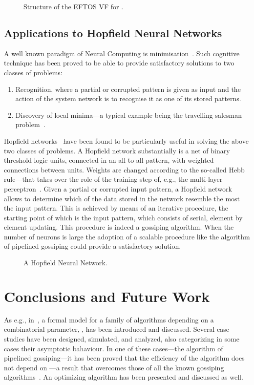\documentclass{elsart}
\begin{document}
\begin{figure}
\centerline{}
\caption{Structure of the EFTOS VF for .}\label{ronew}
\end{figure}


\subsection{Applications to Hopfield Neural Networks}\label{s.hop}
A well known paradigm of Neural Computing is minimisation~\cite{SFK97}. Such cognitive technique
has been proved to be able to provide satisfactory solutions to two classes of problems:
\begin{enumerate}                       
\item Recognition, where a partial or corrupted pattern is given as input and the action of
      the system network is to recognise it as one of its stored patterns.
\item Discovery of local minima---a typical example being the travelling salesman
      problem~\cite{HT85}.
\end{enumerate}

Hopfield networks~\cite{Hop82,Roj96} have been found to be particularly useful in solving the
above two classes of problems. A Hopfield network substantially is a net of
binary threshold logic units, connected in an all-to-all pattern,
with weighted connections between units. Weights are changed according to the
so-called Hebb rule---that takes over the role of the training step of, e.g.,
the multi-layer perceptron~\cite{Ros58}. Given a partial or corrupted input pattern,
a Hopfield network allows to determine which of the data stored in the network
resemble the most the input pattern. This is achieved by means of an iterative
procedure, the starting point of which is the input pattern, which consists of
serial, element by element updating. This procedure is indeed a
gossiping algorithm. When the number of neurons is large the adoption of
a scalable procedure like the algorithm of pipelined gossiping could provide
a satisfactory solution.
\begin{figure}
\centerline{}
\caption{A Hopfield Neural Network.}\label{fig:hop}
\end{figure}


\section{Conclusions and Future Work}\label{end}
As e.g., in~\cite{DeFl96}, a formal model for a family of algorithms depending on a
combinatorial parameter, , has been introduced and discussed.
Several case studies have been designed, simulated, and analyzed, 
also categorizing in some cases their asymptotic bahaviour.
In one of these cases---the algorithm of pipelined gossiping---it has been proved
that the efficiency of the algorithm does not depend on ---a result that
overcomes those of all the known gossiping algorithms~\cite{KruCV92,Hrom96}.
An optimizing algorithm has been presented and discussed as well.
\end{document}
